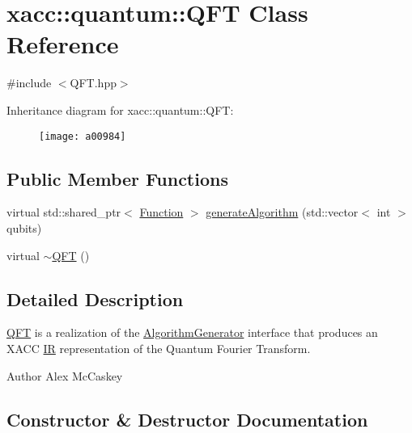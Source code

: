 \hypertarget{a00984}{}\section{xacc\+:\+:quantum\+:\+:Q\+FT Class Reference}
\label{a00984}


{\ttfamily \#include $<$Q\+F\+T.\+hpp$>$}

Inheritance diagram for xacc\+:\+:quantum\+:\+:Q\+FT\+:\begin{figure}[H]
\begin{center}
\leavevmode
\texttt{[image: a00984]}
\end{center}
\end{figure}
\subsection*{Public Member Functions}
\begin{DoxyCompactItemize}
\item 
virtual std\+::shared\+\_\+ptr$<$ \hyperlink{a01124}{Function} $>$ \hyperlink{a00984_ac093c288bc9fc069464fc3fd2cc0ac21}{generate\+Algorithm} (std\+::vector$<$ int $>$ qubits)
\item 
virtual \hyperlink{a00984_a2f585738386f9a3744498983cd1f094e}{$\sim$\+Q\+FT} ()
\end{DoxyCompactItemize}


\subsection{Detailed Description}
\hyperlink{a00984}{Q\+FT} is a realization of the \hyperlink{a01116}{Algorithm\+Generator} interface that produces an X\+A\+CC \hyperlink{a01148}{IR} representation of the Quantum Fourier Transform.

\begin{DoxyAuthor}{Author}
Alex Mc\+Caskey 
\end{DoxyAuthor}


\subsection{Constructor \& Destructor Documentation}
\mbox{\label{a00984_a2f585738386f9a3744498983cd1f094e}} 
